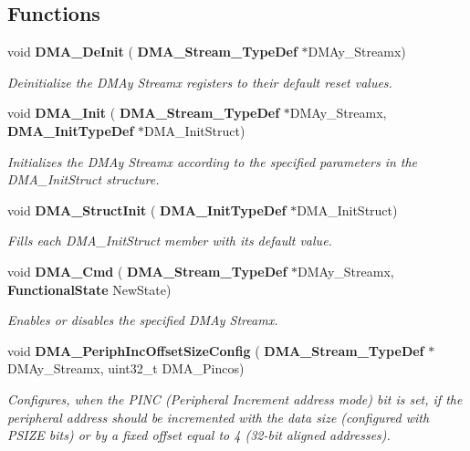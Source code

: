 \subsection*{Functions}
\begin{DoxyCompactItemize}
\item 
void \textbf{ D\+M\+A\+\_\+\+De\+Init} (\textbf{ D\+M\+A\+\_\+\+Stream\+\_\+\+Type\+Def} $\ast$D\+M\+Ay\+\_\+\+Streamx)
\begin{DoxyCompactList}\small\item\em Deinitialize the D\+M\+Ay Streamx registers to their default reset values. \end{DoxyCompactList}\item 
void \textbf{ D\+M\+A\+\_\+\+Init} (\textbf{ D\+M\+A\+\_\+\+Stream\+\_\+\+Type\+Def} $\ast$D\+M\+Ay\+\_\+\+Streamx, \textbf{ D\+M\+A\+\_\+\+Init\+Type\+Def} $\ast$D\+M\+A\+\_\+\+Init\+Struct)
\begin{DoxyCompactList}\small\item\em Initializes the D\+M\+Ay Streamx according to the specified parameters in the D\+M\+A\+\_\+\+Init\+Struct structure. \end{DoxyCompactList}\item 
void \textbf{ D\+M\+A\+\_\+\+Struct\+Init} (\textbf{ D\+M\+A\+\_\+\+Init\+Type\+Def} $\ast$D\+M\+A\+\_\+\+Init\+Struct)
\begin{DoxyCompactList}\small\item\em Fills each D\+M\+A\+\_\+\+Init\+Struct member with its default value. \end{DoxyCompactList}\item 
void \textbf{ D\+M\+A\+\_\+\+Cmd} (\textbf{ D\+M\+A\+\_\+\+Stream\+\_\+\+Type\+Def} $\ast$D\+M\+Ay\+\_\+\+Streamx, \textbf{ Functional\+State} New\+State)
\begin{DoxyCompactList}\small\item\em Enables or disables the specified D\+M\+Ay Streamx. \end{DoxyCompactList}\item 
void \textbf{ D\+M\+A\+\_\+\+Periph\+Inc\+Offset\+Size\+Config} (\textbf{ D\+M\+A\+\_\+\+Stream\+\_\+\+Type\+Def} $\ast$D\+M\+Ay\+\_\+\+Streamx, uint32\+\_\+t D\+M\+A\+\_\+\+Pincos)
\begin{DoxyCompactList}\small\item\em Configures, when the P\+I\+NC (Peripheral Increment address mode) bit is set, if the peripheral address should be incremented with the data size (configured with P\+S\+I\+ZE bits) or by a fixed offset equal to 4 (32-\/bit aligned addresses). \end{DoxyCompactList}\item 

\end{DoxyCompactItemize}
